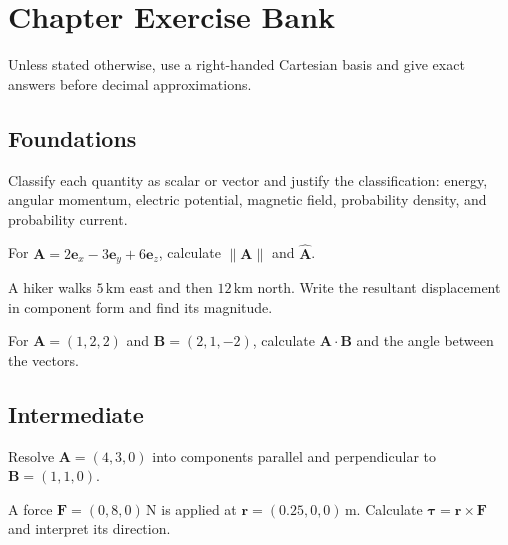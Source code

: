 \section{Chapter Exercise Bank}
\label{sec:chapter1-exercise-bank}

Unless stated otherwise, use a right-handed Cartesian basis and give exact
answers before decimal approximations.

\subsection*{Foundations}

\begin{chapterexercise}
Classify each quantity as scalar or vector and justify the classification:
energy, angular momentum, electric potential, magnetic field, probability
density, and probability current.
\end{chapterexercise}

\begin{chapterexercise}
For $\mathbf A=2\mathbf e_x-3\mathbf e_y+6\mathbf e_z$, calculate
$\lVert\mathbf A\rVert$ and $\widehat{\mathbf A}$.
\end{chapterexercise}

\begin{chapterexercise}
A hiker walks $5\,\mathrm{km}$ east and then $12\,\mathrm{km}$ north. Write the
resultant displacement in component form and find its magnitude.
\end{chapterexercise}

\begin{chapterexercise}
For $\mathbf A=(1,2,2)$ and $\mathbf B=(2,1,-2)$, calculate
$\mathbf A\cdot\mathbf B$ and the angle between the vectors.
\end{chapterexercise}

\subsection*{Intermediate}

\begin{chapterexercise}[Projection]
Resolve $\mathbf A=(4,3,0)$ into components parallel and perpendicular to
$\mathbf B=(1,1,0)$.
\end{chapterexercise}

\begin{chapterexercise}[Torque]
A force $\mathbf F=(0,8,0)\,\mathrm{N}$ is applied at
$\mathbf r=(0.25,0,0)\,\mathrm{m}$. Calculate
$\boldsymbol\tau=\mathbf r\times\mathbf F$ and interpret its direction.
\end{chapterexercise}

